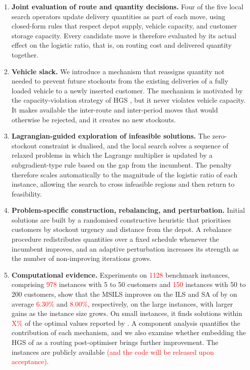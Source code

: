 \begin{enumerate}
  \item \textbf{Joint evaluation of route and quantity decisions.} Four of
  the five local search operators update delivery quantities as part of
  each move, using closed-form rules that respect depot supply, vehicle
  capacity, and customer storage capacity. Every candidate move is
  therefore evaluated by its actual effect on the logistic ratio, that is,
  on routing cost and delivered quantity together.

  \item \textbf{Vehicle slack.} We introduce a mechanism that reassigns
  quantity not needed to prevent future stockouts from the existing
  deliveries of a fully loaded vehicle to a newly inserted customer. The
  mechanism is motivated by the capacity-violation strategy of HGS
  \citep{vidal2022hybrid}, but it never violates vehicle capacity. It makes
  available the inter-route and inter-period moves that would otherwise be
  rejected, and it creates no new stockouts.

  \item \textbf{Lagrangian-guided exploration of infeasible solutions.}
  The zero-stockout constraint is dualised, and the local search solves a
  sequence of relaxed problems in which the Lagrange multiplier is updated
  by a subgradient-type rule based on the gap from the incumbent. The
  penalty therefore scales automatically to the magnitude of the logistic
  ratio of each instance, allowing the search to cross infeasible regions
  and then return to feasibility.

  \item \textbf{Problem-specific construction, rebalancing, and
  perturbation.} Initial solutions are built by a randomised constructive
  heuristic that prioritises customers by stockout urgency and distance
  from the depot. A rebalance procedure redistributes quantities over a
  fixed schedule whenever the incumbent improves, and an adaptive
  perturbation increases its strength as the number of non-improving
  iterations grows.

  \item \textbf{Computational evidence.} Experiments on
  \textcolor{red}{1128} benchmark instances, comprising \textcolor{red}{978}
  instances with 5 to 50 customers and \textcolor{red}{150} instances with
  50 to 200 customers, show that the MSILS improves on the ILS and SA of
  \citet{alvarez2018iterated} by on average \textcolor{red}{6.30\%} and
  \textcolor{red}{8.00\%}, respectively, on the large instances, with larger
  gains as the instance size grows. On small instances, it finds solutions
  within \textcolor{red}{X\%} of the optimal values reported by
  \citet{archetti2019exact}. A component analysis quantifies the
  contribution of each mechanism, and we also examine whether embedding the
  HGS of \citet{vidal2022hybrid} as a routing post-optimiser brings further
  improvement. The instances are publicly available
  \textcolor{red}{(and the code will be released upon acceptance)}.
\end{enumerate}

